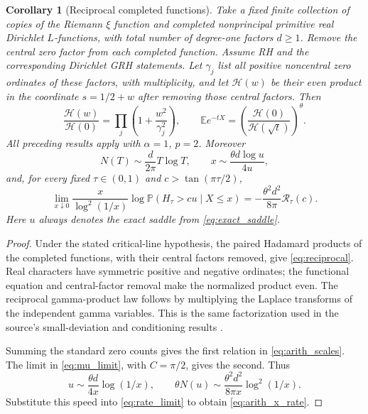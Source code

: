 \documentclass[11pt,letterpaper]{article}
\numberwithin{equation}{section}
\newtheorem{corollary}[theorem]{Corollary}
\theoremstyle{definition}
\theoremstyle{remark}
\newcommand{\PP}{\mathbb P}
\newcommand{\EE}{\mathbb E}
\newcommand{\rate}{\mathcal R_\tau}
\begin{document}
\begin{corollary}[Reciprocal completed functions]\label{cor:arithmetic}
Take a fixed finite collection of copies of the Riemann $\xi$ function and completed nonprincipal primitive \emph{real} Dirichlet $L$-functions, with total number of degree-one factors $d\ge1$. Remove the central zero factor from each completed function. Assume RH and the corresponding Dirichlet GRH statements. Let $\gamma_j$ list all positive noncentral zero ordinates of these factors, with multiplicity, and let $\mathcal H(w)$ be their even product in the coordinate $s=1/2+w$ after removing those central factors. Then
\begin{equation}\label{eq:reciprocal}
 \frac{\mathcal H(w)}{\mathcal H(0)}
 =\prod_j\left(1+\frac{w^2}{\gamma_j^2}\right),
 \qquad
 \EE e^{-tX}=\left(\frac{\mathcal H(0)}{\mathcal H(\sqrt t)}\right)^\theta.
\end{equation}
All preceding results apply with $\alpha=1$, $p=2$. Moreover
\begin{equation}\label{eq:arith_scales}
 N(T)\sim\frac d{2\pi}T\log T,
 \qquad x\sim\frac{\theta d\log u}{4u},
\end{equation}
and, for every fixed $\tau\in(0,1)$ and $c>\tan(\pi\tau/2)$,
\begin{equation}\label{eq:arith_x_rate}
 \boxed{\lim_{x\downarrow0}\frac{x}{\log^2(1/x)}
 \log\PP(H_\tau>cu\mid X\le x)
 =-\frac{\theta^2d^2}{8\pi}\rate(c).}
\end{equation}
Here $u$ always denotes the exact saddle from \cref{eq:exact_saddle}.
\end{corollary}

\begin{proof}
Under the stated critical-line hypothesis, the paired Hadamard products of the completed functions, with their central factors removed, give \cref{eq:reciprocal}. Real characters have symmetric positive and negative ordinates; the functional equation and central-factor removal make the normalized product even. The reciprocal gamma-product law follows by multiplying the Laplace transforms of the independent gamma variables. This is the same factorization used in the source's small-deviation and conditioning results \cite{ProveIt,RoynetteYor,Gao}.

Summing the standard zero counts gives the first relation in \cref{eq:arith_scales}. The limit in \cref{eq:mu_limit}, with $C=\pi/2$, gives the second. Thus
\[
 u\sim\frac{\theta d}{4x}\log(1/x),\qquad
 \theta N(u)\sim\frac{\theta^2d^2}{8\pi x}\log^2(1/x).
\]
Substitute this speed into \cref{eq:rate_limit} to obtain \cref{eq:arith_x_rate}.
\end{proof}
\end{document}
